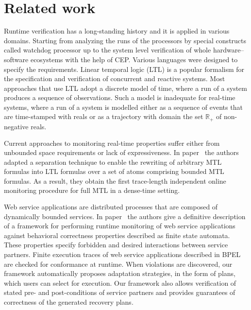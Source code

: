 \section{Related work}
Runtime verification has a long-standing history and it is applied in various domains.
Starting from analyzing the runs of the processors by special constructs called watchdog processor up to the system level verification of whole hardware--software ecosystems with the help of CEP.
Various languages were designed to specify the requirements.
Linear temporal logic (LTL) is a popular formalism for the specification and
verification of concurrent and reactive systems\citep{pnueli1977temporal}.
Most approaches that use LTL adopt a discrete model of time, where a run of a system produces a sequence
of observations. Such a model is inadequate for real-time systems, where a run
of a system is modelled either as a sequence of events that are time-stamped
with reals or as a trajectory with domain the set $\mathbb{R}_+$ of non-negative reals\citep{nivckovic2010mtl}.

Current approaches to monitoring real-time properties suffer either from unbounded space requirements or lack of expressiveness. In paper~\citep{ho2014online} the authors adapted a separation technique to enable  the rewriting of arbitrary MTL formulas into LTL formulas over a set of atoms comprising bounded MTL formulas. As a result, they obtain the first trace-length independent online monitoring procedure for full MTL in a dense-time setting.

Web  service  applications  are  distributed  processes  that  are  composed  of  dynamically  bounded  services.  In paper~\citep{simmonds2013monitoring}  the authors  give  a  definitive description  of  a  framework  for  performing  runtime  monitoring  of  web  service applications against behavioral correctness properties described as finite	state  automata.  These  properties  specify  forbidden  and  desired  interactions	between service partners. Finite execution traces of web service applications described in BPEL are checked for conformance at runtime. When violations	are discovered, our framework automatically proposes adaptation strategies,	in the form of plans, which users can select for execution. Our framework also allows verification of stated pre- and post-conditions of service partners and provides guarantees of correctness of the generated recovery plans.

